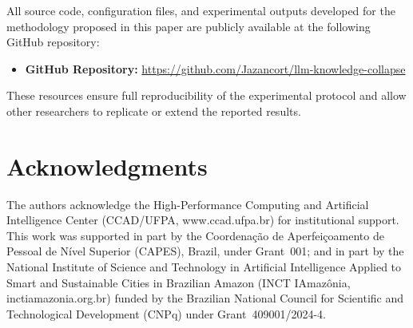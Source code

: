 \documentclass[a4paper,fleqn]{cas-dc}
\begin{document}
All source code, configuration files, and experimental outputs developed for
the methodology proposed in this paper are publicly available at the following
GitHub repository:

\begin{itemize}
\item \textbf{GitHub Repository:} \url{https://github.com/Jazancort/llm-knowledge-collapse}
\end{itemize}

\noindent These resources ensure full reproducibility of the experimental
protocol and allow other researchers to replicate or extend the reported
results.

\section*{Acknowledgments}

The authors acknowledge the High-Performance Computing and Artificial
Intelligence Center (CCAD/UFPA, www.ccad.ufpa.br) for institutional support.
This work was supported in part by the Coordena\c{c}\~{a}o de
Aperfei\c{c}oamento de Pessoal de N\'{i}vel Superior (CAPES), Brazil,
under Grant~001; and in part by the National Institute of Science and
Technology in Artificial Intelligence Applied to Smart and Sustainable Cities
in Brazilian Amazon (INCT IAmazônia, inctiamazonia.org.br) funded by the
Brazilian National Council for Scientific and Technological Development (CNPq)
under Grant~409001/2024-4.



\end{document}

